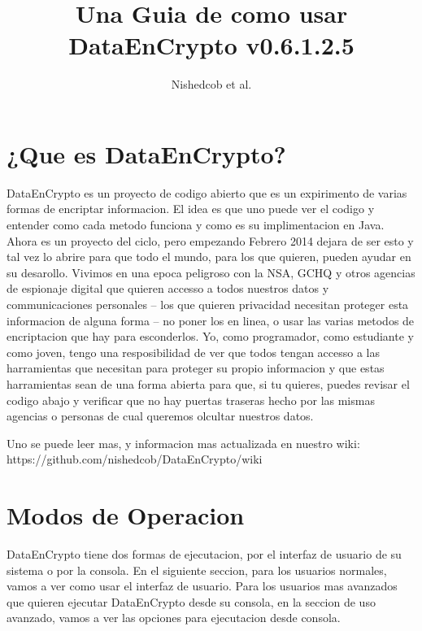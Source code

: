\documentclass{article}
\author{Nishedcob et al.}
\title{Una Guia de como usar DataEnCrypto v0.6.1.2.5}
\begin{document}
	\maketitle
	\tableofcontents
	\section{¿Que es DataEnCrypto?}
		DataEnCrypto es un proyecto de codigo abierto que es un expirimento de varias formas de encriptar informacion. El idea es que uno puede ver el codigo y entender como cada metodo funciona y como es su implimentacion en Java. Ahora es un proyecto del ciclo, pero empezando Febrero 2014 dejara de ser esto y tal vez lo abrire para que todo el mundo, para los que quieren, pueden ayudar en su desarollo. Vivimos en una epoca peligroso con la NSA, GCHQ y otros agencias de espionaje digital que quieren accesso a todos nuestros datos y communicaciones personales -- los que quieren privacidad necesitan proteger esta informacion de alguna forma -- no poner los en linea, o usar las varias metodos de encriptacion que hay para esconderlos. Yo, como programador, como estudiante y como joven, tengo una resposibilidad de ver que todos tengan accesso a las harramientas que necesitan para proteger su propio informacion y que estas harramientas sean de una forma abierta para que, si tu quieres, puedes revisar el codigo abajo y verificar que no hay puertas traseras hecho por las mismas agencias o personas de cual queremos olcultar nuestros datos.

		Uno se puede leer mas, y informacion mas actualizada en nuestro wiki: https://github.com/nishedcob/DataEnCrypto/wiki
	\section{Modos de Operacion}
		DataEnCrypto tiene dos formas de ejecutacion, por el interfaz de usuario de su sistema o por la consola. En el siguiente seccion, para los usuarios normales, vamos a ver como usar el interfaz de usuario. Para los usuarios mas avanzados que quieren ejecutar DataEnCrypto desde su consola, en la seccion de uso avanzado, vamos a ver las opciones para ejecutacion desde consola.
\end{document}
